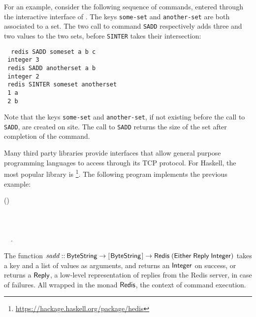 For an example, consider the following sequence of commands, entered through the interactive interface of \Redis{}. The keys \texttt{some-set} and \texttt{another-set}
are both associated to a set. The two call to command \texttt{SADD} respectively
adds three and two values to the two sets, before \texttt{SINTER} takes their intersection:
\begin{tabbing}\tt
~redis~SADD~someset~a~b~c\\
\tt ~integer~3\\
\tt ~redis~SADD~anotherset~a~b\\
\tt ~integer~2\\
\tt ~redis~SINTER~someset~anotherset\\
\tt ~1~a\\
\tt ~2~b
\end{tabbing}

Note that the keys \texttt{some-set} and \texttt{another-set}, if not existing before the call to \texttt{SADD}, are created on site. The call to
\texttt{SADD} returns the size of the set after completion of the command.

Many third party libraries provide interfaces that allow general purpose programming languages to access \Redis{} through its TCP protocol.
For Haskell, the most popular library is \Hedis{}\footnote{\url{https://hackage.haskell.org/package/hedis}}.
The following program implements the previous example:
\begin{hscode}\SaveRestoreHook
{}%
%
%
\>[B]{}\mathbin{::}\;(\;){}\<[E]%
\\
\>[B]{}\mathrel{=}\<[E]%
\\
\>[B]{}\<[5]%
\>[5]{}\;\<[E]%
\\
\>[B]{}\<[5]%
\>[5]{}\;\<[E]%
\\
\>[B]{}\<[5]%
\>[5]{}~~.{}\<[E]%
\ColumnHook
\end{hscode}\resethooks
The function \ensuremath{\Varid{sadd}\mathbin{::}\Conid{ByteString}\to [\mskip1.5mu \Conid{ByteString}\mskip1.5mu]\to \Conid{Redis}\;(\Conid{Either}\;\Conid{Reply}\;\Conid{Integer})} takes a key and a list of values as arguments, and returns
an \ensuremath{\Conid{Integer}} on success, or returns a \ensuremath{\Conid{Reply}}, a low-level representation of
replies from the Redis server, in case of failures. All wrapped in the monad
\ensuremath{\Conid{Redis}}, the context of command execution.\footnotemark

